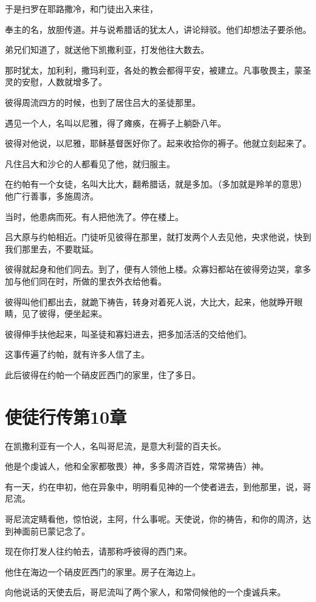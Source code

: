 \documentclass[12pt,oneside]{book}
\begin{document}
于是扫罗在耶路撒冷，和门徒出入来往，

奉主的名，放胆传道。并与说希腊话的犹太人，讲论辩驳。他们却想法子要杀他。

弟兄们知道了，就送他下凯撒利亚，打发他往大数去。

那时犹太，加利利，撒玛利亚，各处的教会都得平安，被建立。凡事敬畏主，蒙圣灵的安慰，人数就增多了。

彼得周流四方的时候，也到了居住吕大的圣徒那里。

遇见一个人，名叫以尼雅，得了瘫痪，在褥子上躺卧八年。

彼得对他说，以尼雅，耶稣基督医好你了。起来收拾你的褥子。他就立刻起来了。

凡住吕大和沙仑的人都看见了他，就归服主。

在约帕有一个女徒，名叫大比大，翻希腊话，就是多加。（多加就是羚羊的意思）他广行善事，多施周济。

当时，他患病而死。有人把他洗了。停在楼上。

吕大原与约帕相近。门徒听见彼得在那里，就打发两个人去见他，央求他说，快到我们那里去，不要耽延。

彼得就起身和他们同去。到了，便有人领他上楼。众寡妇都站在彼得旁边哭，拿多加与他们同在时，所做的里衣外衣给他看。

彼得叫他们都出去，就跪下祷告，转身对着死人说，大比大，起来，他就睁开眼睛，见了彼得，便坐起来。

彼得伸手扶他起来，叫圣徒和寡妇进去，把多加活活的交给他们。

这事传遍了约帕，就有许多人信了主。

此后彼得在约帕一个硝皮匠西门的家里，住了多日。

\chapter{使徒行传第10章}
在凯撒利亚有一个人，名叫哥尼流，是意大利营的百夫长。

他是个虔诚人，他和全家都敬畏）神，多多周济百姓，常常祷告）神。

有一天，约在申初，他在异象中，明明看见神的一个使者进去，到他那里，说，哥尼流。

哥尼流定睛看他，惊怕说，主阿，什么事呢。天使说，你的祷告，和你的周济，达到神面前已蒙记念了。

现在你打发人往约帕去，请那称呼彼得的西门来。

他住在海边一个硝皮匠西门的家里。房子在海边上。

向他说话的天使去后，哥尼流叫了两个家人，和常伺候他的一个虔诚兵来。
\end{document}
